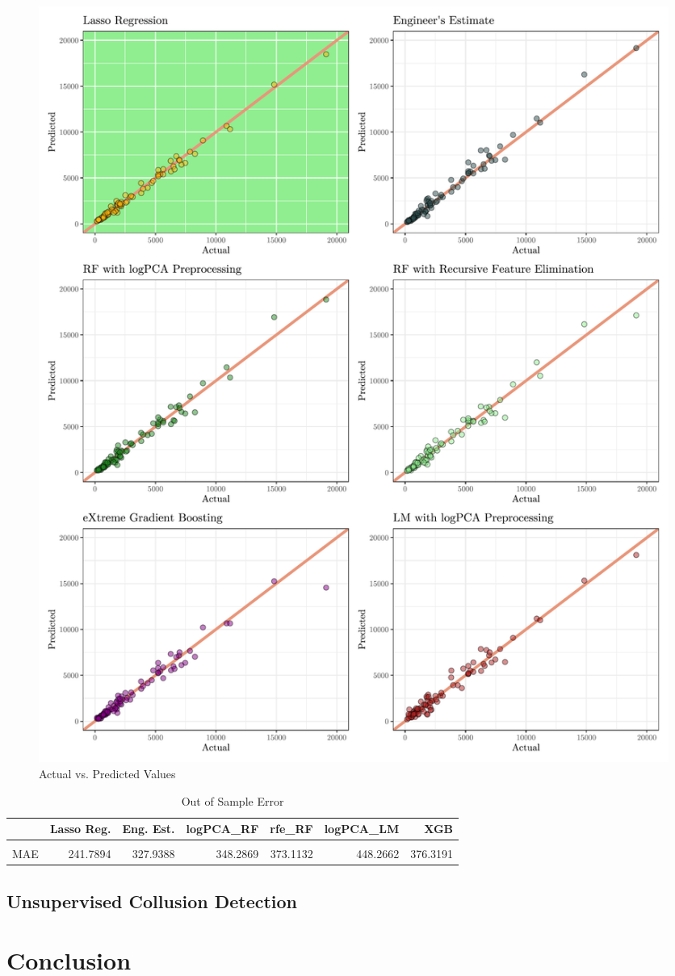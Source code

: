 \documentclass[a4paper,12pt, headsepline]{scrartcl}
\numberwithin{equation}{section}
\begin{document}
\begin{figure}[H]
	\includegraphics[width = 14	cm]{figures/percomp.pdf}
	\caption{Actual vs. Predicted Values}\label{fig:percomp}
\end{figure}

\begin{table}[H]
	\centering
	\begin{tabular}[t]{lrrrrrr}
		\toprule
		& Lasso Reg. & Eng. Est. & logPCA\_RF & rfe\_RF & logPCA\_LM & XGB\\
		\midrule
		\cellcolor{gray!6}{RMSE} & \cellcolor{gray!6}{326.1261} & \cellcolor{gray!6}{497.0567} & \cellcolor{gray!6}{509.7934} & \cellcolor{gray!6}{560.7600} & \cellcolor{gray!6}{609.4673} & \cellcolor{gray!6}{671.6634}\\
		MAE & 241.7894 & 327.9388 & 348.2869 & 373.1132 & 448.2662 & 376.3191\\
		\bottomrule
	\end{tabular}
	\caption{Out of Sample Error}\label{tab:percomp}
\end{table}
\subsection{Unsupervised Collusion Detection}\label{subsec:col}
\section{Conclusion}\label{sec:con}
 
\newpage
\printbibliography
\end{document}

